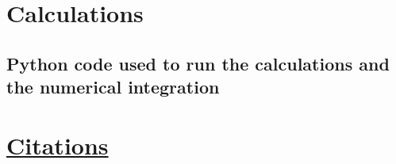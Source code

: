\documentclass[%
 aapm,
 mph,%
 amsmath,amssymb,
 reprint,%
]{revtex4-2}
\begin{document}
{
\appendix





\section{Calculations}
% 

\subsection{\label{app:python}Python code used to run the calculations and the numerical integration}


}


\nocite{*}
\section*{\underline{Citations}}
\end{document}
